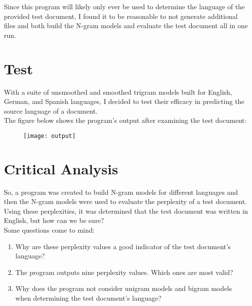 \documentclass[a4,10pt]{article}
\begin{document}
Since this program will likely only ever be used to determine the language of the provided test document, I found it to be reasonable to not generate additional files and both build the N-gram models and evaluate the test document all in one run.

\section{Test}

With a suite of unsmoothed and smoothed trigram models built for English, German, and Spanish languages, I decided to test their efficacy in predicting the source language of a document. \\

The figure below shows the program's output after examining the test document:

\begin{figure}[hb]
  \centering
  \texttt{[image: output]}
\end{figure}

\section{Critical Analysis}

So, a program was created to build N-gram models for different languages and then the N-gram models were used to evaluate the perplexity of a test document. \\

Using these perplexities, it was determined that the test document was written in English, but how can we be sure? \\

Some questions come to mind:  \\

\begin{addmargin}[2em]{0em}

\begin{enumerate}[(1)]

\item Why are these perplexity values a good indicator of the test document's language?
\item The program outputs nine perplexity values. Which ones are most valid?
\item Why does the program not consider unigram models and bigram models when determining the test document's language? 

\end{enumerate}

\end{addmargin}
\end{document}
